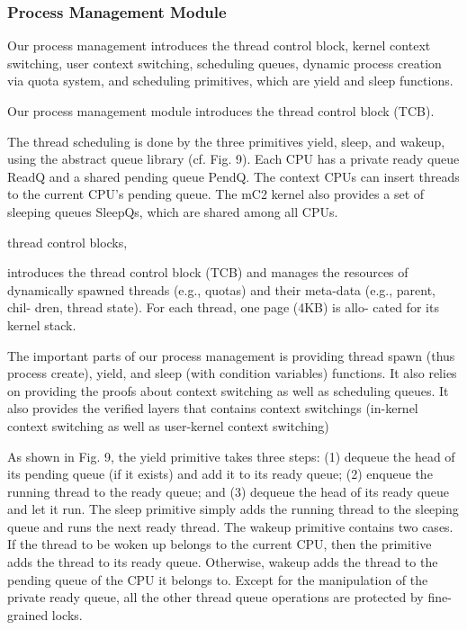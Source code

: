 \subsubsection{Process Management Module}

Our process management introduces the thread control block, kernel context switching, user context switching, scheduling queues, dynamic process creation via quota system, and scheduling primitives, which are yield and sleep functions. 



Our process management module introduces the thread control block (TCB). 

The thread scheduling is done by the three primitives yield, sleep, and wakeup, using the abstract queue library (cf. Fig. 9). Each CPU has a private ready queue ReadQ and a shared pending queue PendQ. The context CPUs can insert threads to the current CPU’s pending queue. The mC2 kernel also provides a set of sleeping queues SleepQs, which are shared among all CPUs.



thread control blocks, 

introduces the thread control block (TCB) and manages the resources of dynamically spawned threads (e.g., quotas) and their meta-data (e.g., parent, chil-
dren, thread state). For each thread, one page (4KB) is allo- cated for its kernel stack.



The important parts of our process management is providing 
thread spawn (thus process create), yield, and sleep (with condition variables) functions.
It also relies on providing the proofs about 
context switching as well as scheduling queues.
It also provides 
the verified layers that contains context switchings (in-kernel context switching as well as user-kernel context switching)




As shown in Fig. 9, the yield primitive takes three steps: (1) dequeue the head of its pending queue (if it exists) and add it to its ready queue; (2) enqueue the running thread to the ready queue; and (3) dequeue the head of its ready queue and let it run. The sleep primitive simply adds the running thread to the sleeping queue and runs the next ready thread. The wakeup primitive contains two cases. If the thread to be woken up belongs to the current CPU, then the primitive adds the thread to its ready queue. Otherwise, wakeup adds the thread to the pending queue of the CPU it belongs to. Except for the manipulation of the private ready queue, all the other thread queue operations are protected by fine-grained locks.



